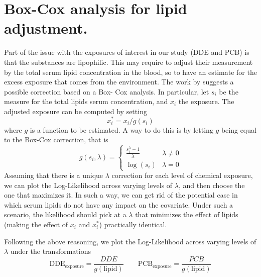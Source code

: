 \documentclass[10pt]{jmlr}%
\begin{document}
\newpage  %

\section{Box-Cox analysis for lipid adjustment.}
\label{appendix:boxcox}

Part of the issue with the exposures of interest in our study (DDE and PCB) is that the substances are lipophilic. This may require to adjust their measurement by the total serum lipid concentration in the blood, so to have an estimate for the excess exposure that comes from the environment. The work by \cite{Li_Long_Duns} suggests a possible correction based on a Box- Cox analysis. In particular, let $s_i$ be the measure for the total lipids serum concentration, and $x_i$ the exposure. The adjusted exposure can be computed by setting 
\begin{equation}
x_i^* = x_i/g(s_i)
\end{equation} 
where $g$ is a function to be estimated. A way to do this is by letting $g$ being equal to the Box-Cox correction, that is
\begin{equation}
g(s_i,\lambda) = 
\begin{cases} 
\frac{s_i^\lambda-1}{\lambda} & \lambda \neq 0 \\
\log(s_i) & \lambda =0 
\end{cases}
\end{equation}
Assuming that there is a unique $\lambda$ correction for each level of chemical exposure, we can plot the Log-Likelihood across varying levels of $\lambda$, and then choose the one that maximizes it. In such a way, we can get rid of the potential case in which serum lipids do not have any impact on the covariate. Under such a scenario, the likelihood should pick at a $\lambda$ that minimizes the effect of lipids (making the effect of $x_i$ and $x_i^*$) practically identical. 

Following the above reasoning, we plot the Log-Likelihood across varying levels of $\lambda$  under the transformations
\begin{equation}
\textrm{DDE}_{\text{exposure}} = \frac{DDE}{g(\text{lipid})} \qquad \textrm{PCB}_{\text{exposure}} = \frac{PCB}{g(\text{lipid})}
\end{equation}
\end{document}
